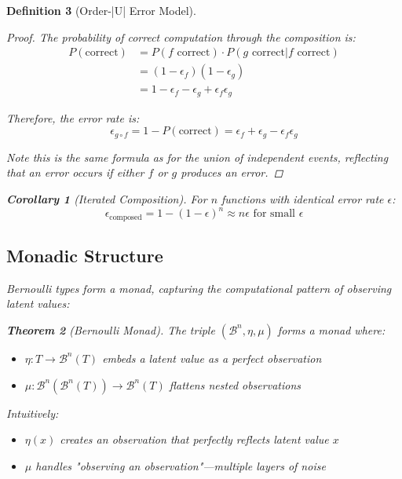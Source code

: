 \documentclass[11pt,final,hidelinks]{article}
\newtheorem{theorem}{Theorem}[section]
\newtheorem{corollary}[theorem]{Corollary}
\newtheorem{definition}[theorem]{Definition}
\begin{document}
\begin{definition}[Order-|U| Error Model]
\begin{proof}
The probability of correct computation through the composition is:
\begin{align}
P(\text{correct}) &= P(f \text{ correct}) \cdot P(g \text{ correct} | f \text{ correct}) \\
&= (1 - \epsilon_f)(1 - \epsilon_g) \\
&= 1 - \epsilon_f - \epsilon_g + \epsilon_f \epsilon_g
\end{align}

Therefore, the error rate is:
\begin{equation}
\epsilon_{g \circ f} = 1 - P(\text{correct}) = \epsilon_f + \epsilon_g - \epsilon_f \epsilon_g
\end{equation}

Note this is the same formula as for the union of independent events, reflecting that an error occurs if either $f$ or $g$ produces an error.
\end{proof}

\begin{corollary}[Iterated Composition]
For $n$ functions with identical error rate $\epsilon$:
\begin{equation}
\epsilon_{\text{composed}} = 1 - (1 - \epsilon)^n \approx n\epsilon \text{ for small } \epsilon
\end{equation}
\end{corollary}

\subsection{Monadic Structure}

Bernoulli types form a monad, capturing the computational pattern of observing latent values:

\begin{theorem}[Bernoulli Monad]
The triple $(\mathcal{B}^n, \eta, \mu)$ forms a monad where:
\begin{itemize}
    \item $\eta: T \to \mathcal{B}^n(T)$ embeds a latent value as a perfect observation
    \item $\mu: \mathcal{B}^n(\mathcal{B}^n(T)) \to \mathcal{B}^n(T)$ flattens nested observations
\end{itemize}

Intuitively:
\begin{itemize}
    \item $\eta(x)$ creates an observation that perfectly reflects latent value $x$
    \item $\mu$ handles "observing an observation"—multiple layers of noise
\end{itemize}
\end{theorem}


\end{definition}
\end{document}
